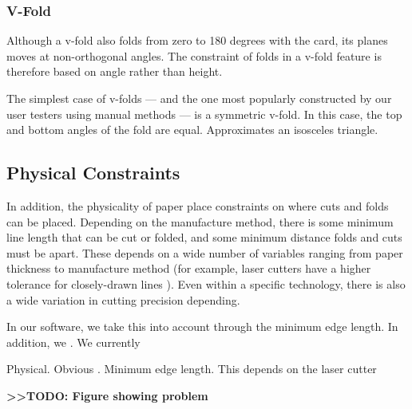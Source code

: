 \subsubsection{V-Fold}\label{v-fold}

Although a v-fold also folds from zero to 180 degrees with the card, its
planes moves at non-orthogonal angles. The constraint of folds in a
v-fold feature is therefore based on angle rather than height.

The simplest case of v-folds --- and the one most popularly constructed
by our user testers using manual methods --- is a symmetric v-fold. In
this case, the top and bottom angles of the fold are equal. Approximates
an isosceles triangle.

\subsection{Physical Constraints}\label{physical-constraints}

In addition, the physicality of paper place constraints on where cuts
and folds can be placed. Depending on the manufacture method, there is
some minimum line length that can be cut or folded, and some minimum
distance folds and cuts must be apart. These depends on a wide number of
variables ranging from paper thickness to manufacture method (for
example, laser cutters have a higher tolerance for closely-drawn lines
). Even within a specific technology, there is also a wide variation in
cutting precision depending.

In our software, we take this into account through the minimum edge
length. In addition, we . We currently

Physical. Obvious . Minimum edge length. This depends on the laser
cutter

\textbf{\textgreater{}\textgreater{}TODO: Figure showing problem}
